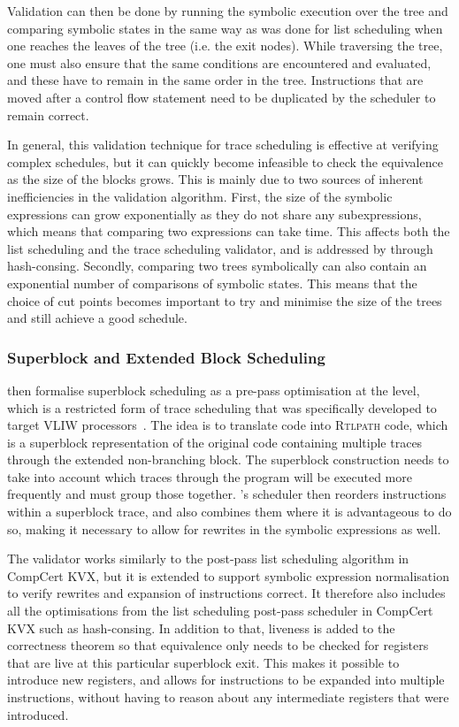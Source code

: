 Validation can then be done by running the symbolic execution over the tree and
comparing symbolic states in the same way as was done for list scheduling when
one reaches the leaves of the tree (i.e. the exit nodes).  While traversing the
tree, one must also ensure that the same conditions are encountered and
evaluated, and these have to remain in the same order in the tree.  Instructions
that are moved after a control flow statement need to be duplicated by the
scheduler to remain correct.

In general, this validation technique for trace scheduling is effective at
verifying complex schedules, but it can quickly become infeasible to check the
equivalence as the size of the blocks grows.  This is mainly due to two sources
of inherent inefficiencies in the validation algorithm.  First, the size of the
symbolic expressions can grow exponentially as they do not share any
subexpressions, which means that comparing two expressions can take time.  This
affects both the list scheduling and the trace scheduling validator, and is
addressed by \citeauthor*{six20_certif_effic_instr_sched} through hash-consing.
Secondly, comparing two trees symbolically can also contain an exponential
number of comparisons of symbolic states.  This means that the choice of cut
points becomes important to try and minimise the size of the trees and still
achieve a good schedule.

\subsubsection{Superblock and Extended Block Scheduling}

\textcite{six22_formal_verif_super_sched} then formalise superblock scheduling
as a pre-pass optimisation at the \rtl{} level, which is a restricted form of
trace scheduling that was specifically developed to target VLIW
processors~\cite[]{hwu93_super}.  The idea is to translate \rtl{} code into
\textsc{Rtlpath} code, which is a superblock representation of the original code
containing multiple traces through the extended non-branching block.  The
superblock construction needs to take into account which traces through the
program will be executed more frequently and must group those together.
\citeauthor{six22_formal_verif_super_sched}'s scheduler then reorders
instructions within a superblock trace, and also combines them where it is
advantageous to do so, making it necessary to allow for rewrites in the symbolic
expressions as well.

The validator works similarly to the post-pass list scheduling algorithm in
CompCert KVX, but it is extended to support symbolic expression normalisation to
verify rewrites and expansion of instructions correct.  It therefore also
includes all the optimisations from the list scheduling post-pass scheduler in
CompCert KVX such as hash-consing.  In addition to that, liveness is added to
the correctness theorem so that equivalence only needs to be checked for
registers that are live at this particular superblock exit.  This makes it
possible to introduce new registers, and allows for instructions to be expanded
into multiple instructions, without having to reason about any intermediate
registers that were introduced.

